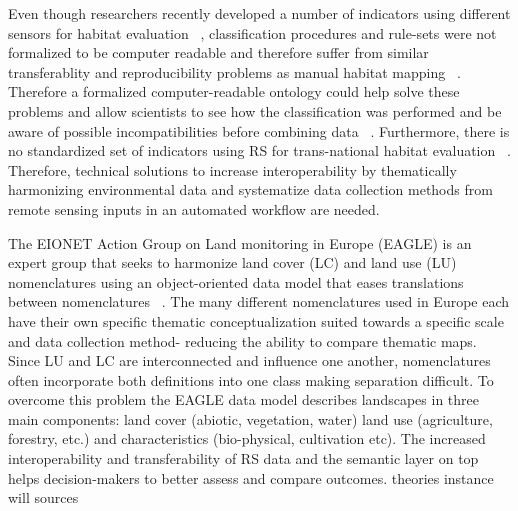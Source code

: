 \documentclass[authoryear,preprint,12pt,number]{elsarticle}
\begin{document}
Even though researchers recently developed a number of indicators using 
different sensors for habitat evaluation ~\citep{Nagendra2013}, classification 
procedures and rule-sets were not formalized to be computer readable and 
therefore suffer from similar transferablity and reproducibility problems as 
manual habitat mapping ~\citep{Arvor2013, Nieland2015a, Nieland2015b}. 
Therefore 
a formalized computer-readable ontology could help solve these problems and 
allow scientists to see how the classification was performed and be aware of 
possible incompatibilities before combining data ~\citep{Janowicz2012}.  
Furthermore, there is no standardized set of indicators using RS for 
trans-national habitat evaluation ~\citep{Lucas2015, VandenBorre2011}. 
Therefore, technical solutions to increase interoperability by thematically 
harmonizing environmental data and systematize data collection methods from 
remote sensing inputs in an automated workflow are needed. 

The EIONET Action Group on Land monitoring in Europe (EAGLE) is an expert group
that seeks to harmonize land cover (LC) and land use (LU) nomenclatures using an
object-oriented data model that eases translations between nomenclatures
~\citep{arnold2013eagle}. The many different nomenclatures used in Europe each
have their own specific thematic conceptualization suited towards a specific
scale and data collection method- reducing the ability to compare thematic maps.
Since LU and LC are interconnected and influence one another, nomenclatures
often incorporate both definitions into one class making separation difficult.
To overcome this problem the EAGLE data model describes landscapes in three main
components: land cover (abiotic, vegetation, water) land use (agriculture,
forestry, etc.) and characteristics (bio-physical, cultivation etc). The
increased interoperability and transferability of RS data and the semantic layer
on top helps decision-makers to better assess and compare outcomes. 
theories
instance
will
sources
\end{document}
